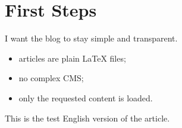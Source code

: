 \section{First Steps}

I want the blog to stay simple and transparent.

\begin{itemize}
\item articles are plain LaTeX files;
\item no complex CMS;
\item only the requested content is loaded.
\end{itemize}

This is the test English version of the article.
